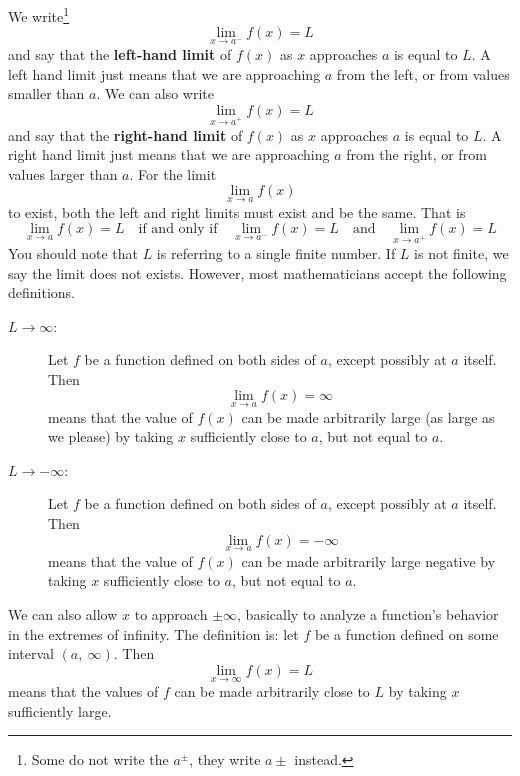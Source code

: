 \documentclass[12pt,addpoints, answers, fleqn]{exam}
\begin{document}
We write\footnote{Some do not write the $a^{\pm} $, they write $a{\pm} $ instead.}
\[
\mathop {\lim }\limits_{x \to a^- }  f \left( x \right) = L
\]
and say that the \textbf{left-hand limit} of $f \left( x \right)$ as $x$ approaches $a$ is equal to $L$. A left hand limit just means that we are approaching $a$ from the left, or from values smaller than $a$. We can also write
\[
\mathop {\lim }\limits_{x \to a^+ }  f \left( x \right) = L
\]
and say that the \textbf{right-hand limit} of $f \left( x \right)$ as $x$ approaches $a$ is equal to $L$. A right hand limit just means that we are approaching $a$ from the right, or from values larger than $a$. For the limit
\[
\mathop {\lim }\limits_{x \to a }  f \left( x \right)
\]
to exist, both the left and right limits must exist and be the same. That is
\[
\mathop {\lim }\limits_{x \to a }  f \left( x \right) = L \quad \mbox{if and only if} \quad \mathop {\lim }\limits_{x \to a^- }  f \left( x \right) = L \quad \mbox{and} \quad \mathop {\lim }\limits_{x \to a^+ }  f \left( x \right) = L
\]
You should note that $L$ is referring to a single finite number. If $L$ is not finite, we say the limit does not exists. However, most mathematicians accept the following definitions.
\begin{description}
\item[$L \rightarrow \infty$:] Let $f$ be a function defined on both sides of $a$, except possibly at $a$ itself. Then
\[
\mathop {\lim }\limits_{x \to a }  f \left( x \right) = \infty
\]
means that the value of $f\left(x\right)$ can be made arbitrarily large (as large as we please) by taking $x$ sufficiently close to $a$, but not equal to $a$.
\item[$L \rightarrow  -\infty$:] Let $f$ be a function defined on both sides of $a$, except possibly at $a$ itself. Then
\[
\mathop {\lim }\limits_{x \to a }  f \left( x \right) = -\infty
\]
means that the value of $f\left(x\right)$ can be made arbitrarily large negative by taking $x$ sufficiently close to $a$, but not equal to $a$.
\end{description}



We can also allow $x$ to approach $\pm \infty$, basically to analyze a function's behavior in the extremes of infinity. The definition is: let $f$ be a function defined on some interval $\left( a, \ \infty \right)$. Then
\[
\mathop {\lim }\limits_{x \to \infty }  f \left( x \right) = L
\]
means that the values of $f$ can be made arbitrarily close to $L$ by taking $x$ sufficiently large.
\end{document}
